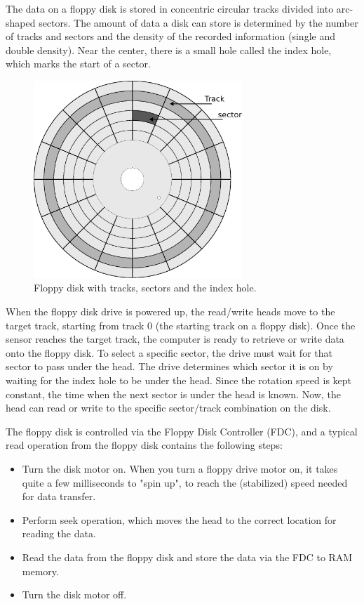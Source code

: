 \documentclass[book.tex]{subfiles}
\begin{document}
\par
The data on a floppy disk is stored in concentric circular tracks divided into arc-shaped sectors. The amount of data a disk can store is determined by the number of tracks and sectors and the density of the recorded information (single and double density). Near the center, there is a small hole called the index hole, which marks the start of a sector.\\

\begin{figure}[H]
\centering
      \includegraphics[width=0.7\textwidth]{imgs/drawings/floppy_disk.eps}
      \caption{Floppy disk with tracks, sectors and the index hole.}
\end{figure}

\par
When the floppy disk drive is powered up, the read/write heads move to the target track, starting from track 0 (the starting track on a floppy disk). Once the sensor reaches the target track, the computer is ready to retrieve or write data onto the floppy disk. To select a specific sector, the drive must wait for that sector to pass under the head. The drive determines which sector it is on by waiting for the index hole to be under the head. Since the rotation speed is kept constant, the time when the next sector is under the head is known. Now, the head can read or write to the specific sector/track combination on the disk.\\


\par
The floppy disk is controlled via the Floppy Disk Controller (FDC), and a typical read operation from the floppy disk contains the following steps:
\begin{itemize}
  \item Turn the disk motor on. When you turn a floppy drive motor on, it takes quite a few milliseconds to "spin up", to reach the (stabilized) speed needed for data transfer.
  \item Perform seek operation, which moves the head to the correct location for reading the data.
  \item Read the data from the floppy disk and store the data via the FDC to RAM memory.
  \item Turn the disk motor off. 
\end{itemize}
\end{document}
